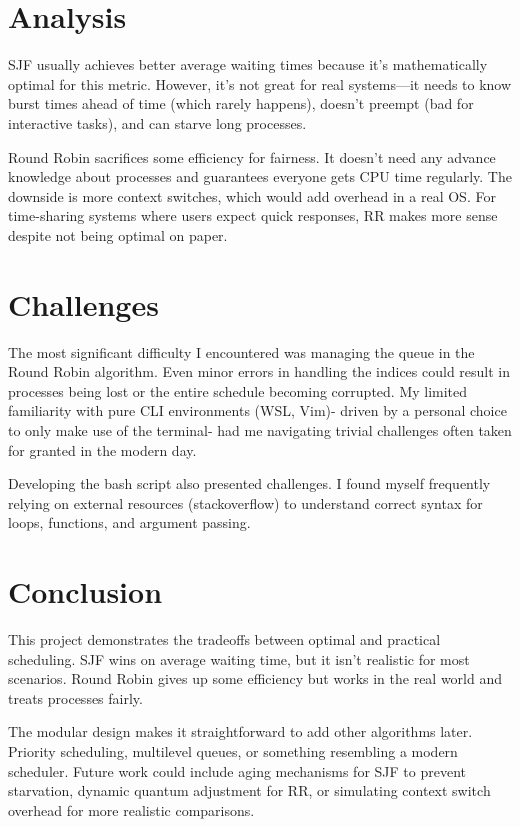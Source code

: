 \documentclass[12pt]{article}
\begin{document}
\section{Analysis}

SJF usually achieves better average waiting times because it's mathematically optimal for this metric. However, it's not great for real systems—it needs to know burst times ahead of time (which rarely happens), doesn't preempt (bad for interactive tasks), and can starve long processes.

Round Robin sacrifices some efficiency for fairness. It doesn't need any advance knowledge about processes and guarantees everyone gets CPU time regularly. The downside is more context switches, which would add overhead in a real OS. For time-sharing systems where users expect quick responses, RR makes more sense despite not being optimal on paper.

\section{Challenges}

The most significant difficulty I encountered was managing the queue in the Round Robin algorithm. Even minor errors in handling the indices could result in processes being lost or the entire schedule becoming corrupted. My limited familiarity with pure CLI environments (WSL, Vim)- driven by a personal choice to only make use of the terminal- had me navigating trivial challenges often taken for granted in the modern day.

Developing the bash script also presented challenges. I found myself frequently relying on external resources (stackoverflow) to understand correct syntax for loops, functions, and argument passing.

\section{Conclusion}
This project demonstrates the tradeoffs between optimal and practical scheduling. SJF wins on average waiting time, but it isn't realistic for most scenarios. Round Robin gives up some efficiency but works in the real world and treats processes fairly.

The modular design makes it straightforward to add other algorithms later. Priority scheduling, multilevel queues, or something resembling a modern scheduler. Future work could include aging mechanisms for SJF to prevent starvation, dynamic quantum adjustment for RR, or simulating context switch overhead for more realistic comparisons.
\end{document}
